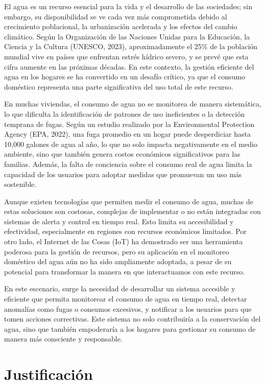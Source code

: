 \documentclass[conference]{IEEEtran}
\begin{document}
El agua es un recurso esencial para la vida y el desarrollo de las sociedades;
sin embargo, su disponibilidad se ve cada vez más comprometida debido al
crecimiento poblacional, la urbanización acelerada y los efectos del cambio
climático. Según la Organización de las Naciones Unidas para la Educación, la
Ciencia y la Cultura (UNESCO, 2023), aproximadamente el 25\% de la población
mundial vive en países que enfrentan estrés hídrico severo, y se prevé que esta
cifra aumente en las próximas décadas. En este contexto, la gestión eficiente
del agua en los hogares se ha convertido en un desafío crítico, ya que el
consumo doméstico representa una parte significativa del uso total de este
recurso.

En muchas viviendas, el consumo de agua no se monitorea de manera sistemática,
lo que dificulta la identificación de patrones de uso ineficientes o la
detección temprana de fugas. Según un estudio realizado por la Environmental
Protection Agency (EPA, 2022), una fuga promedio en un hogar puede desperdiciar
hasta 10,000 galones de agua al año, lo que no solo impacta negativamente en el
medio ambiente, sino que también genera costos económicos significativos para
las familias. Además, la falta de conciencia sobre el consumo real de agua
limita la capacidad de los usuarios para adoptar medidas que promuevan un uso
más sostenible.

Aunque existen tecnologías que permiten medir el consumo de agua, muchas de
estas soluciones son costosas, complejas de implementar o no están integradas
con sistemas de alerta y control en tiempo real. Esto limita su accesibilidad y
efectividad, especialmente en regiones con recursos económicos limitados. Por
otro lado, el Internet de las Cosas (IoT) ha demostrado ser una herramienta
poderosa para la gestión de recursos, pero su aplicación en el monitoreo
doméstico del agua aún no ha sido ampliamente adoptada, a pesar de su potencial
para transformar la manera en que interactuamos con este recurso.

En este escenario, surge la necesidad de desarrollar un sistema accesible y
eficiente que permita monitorear el consumo de agua en tiempo real, detectar
anomalías como fugas o consumos excesivos, y notificar a los usuarios para que
tomen acciones correctivas. Este sistema no solo contribuiría a la conservación
del agua, sino que también empoderaría a los hogares para gestionar su consumo
de manera más consciente y responsable.

\section{Justificación}
\end{document}
